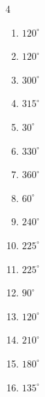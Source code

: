 \begin{multicols}{4}
\begin{enumerate}
  \item $\displaystyle 120^{\circ}$

  \item $\displaystyle 120^{\circ}$

  \item $\displaystyle 300^{\circ}$

  \item $\displaystyle 315^{\circ}$

  \item $\displaystyle 30^{\circ}$

  \item $\displaystyle 330^{\circ}$

  \item $\displaystyle 360^{\circ}$
        \phantom{$\displaystyle =2\pi$}

  \item $\displaystyle 60^{\circ}$

  \item $\displaystyle 240^{\circ}$

\columnbreak %

  \item $\displaystyle 225^{\circ}$

  \item $\displaystyle 225^{\circ}$

  \item $\displaystyle 90^{\circ}$

  \item $\displaystyle 120^{\circ}$

  \item $\displaystyle 210^{\circ}$

  \item $\displaystyle 180^{\circ}$
        \phantom{$\displaystyle =\pi$}

  \item $\displaystyle 135^{\circ}$


\end{enumerate}
\end{multicols}
